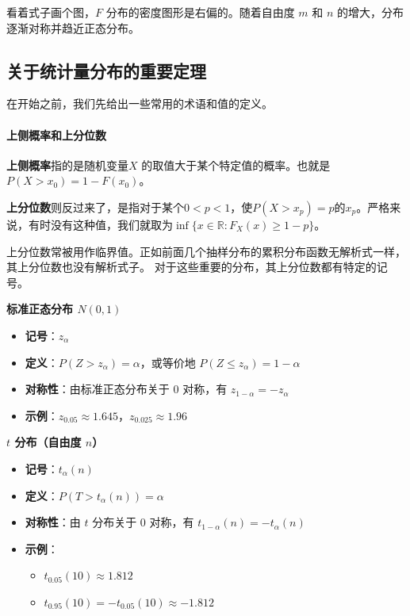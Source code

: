 看着式子画个图，$F$ 分布的密度图形是右偏的。随着自由度 $m$ 和 $n$ 的增大，分布逐渐对称并趋近正态分布。

\subsection{关于统计量分布的重要定理}
在开始之前，我们先给出一些常用的术语和值的定义。
\paragraph{上侧概率和上分位数}

\textbf{上侧概率}指的是随机变量$X$ 的取值大于某个特定值的概率。也就是$P(X>x_0)=1-F(x_0)$。

\textbf{上分位数}则反过来了，是指对于某个$0<p<1$，使$P(X>x_p)=p$的$x_p$。严格来说，有时没有这种值，我们就取为$\inf \{x\in \mathbb{R}:F_X(x)\geq 1-p \}$。

上分位数常被用作临界值。正如前面几个抽样分布的累积分布函数无解析式一样，其上分位数也没有解析式子。
对于这些重要的分布，其上分位数都有特定的记号。

\textbf{标准正态分布 $N(0,1)$}
\begin{itemize}
    \item \textbf{记号}：$z_{\alpha}$
    \item \textbf{定义}：$P(Z > z_{\alpha}) = \alpha$，或等价地 $P(Z \le z_{\alpha}) = 1 - \alpha$
    \item \textbf{对称性}：由标准正态分布关于 $0$ 对称，有 $z_{1-\alpha}= -z_{\alpha}$
    \item \textbf{示例}：$z_{0.05} \approx 1.645$，$z_{0.025} \approx 1.96$
\end{itemize}

\textbf{$t$ 分布（自由度 $n$）}
\begin{itemize}
    \item \textbf{记号}：$t_{\alpha}(n)$
    \item \textbf{定义}：$P(T > t_{\alpha}(n)) = \alpha$
    \item \textbf{对称性}：由 $t$ 分布关于 $0$ 对称，有 $t_{1-\alpha}(n) = -t_{\alpha}(n)$
    \item \textbf{示例}：
        \begin{itemize}
            \item $t_{0.05}(10) \approx 1.812$
            \item $t_{0.95}(10) = -t_{0.05}(10) \approx -1.812$
        \end{itemize}
\end{itemize}

